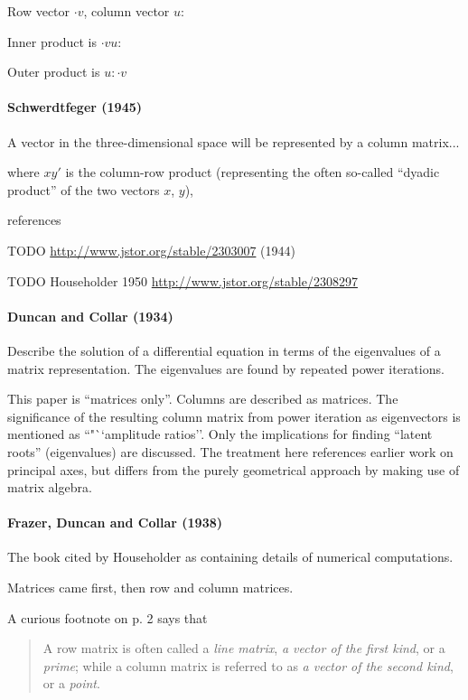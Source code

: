 Row vector $\cdot v$, column vector $u:$

Inner product is $\cdot v u:$

Outer product is $u:\cdot v$



\paragraph{Schwerdtfeger (1945)~\cite{Schwerdtfeger1945}}

A vector in the three-dimensional space will
be represented by a column matrix...

where $xy'$ is the column-row product (representing
the often so-called ``dyadic product'' of the
two vectors $x$, $y$),

references \cite{Schwerdtfeger1938,Murnaghan1938,Pipes1937}

TODO \url{http://www.jstor.org/stable/2303007} (1944)

TODO Householder 1950 \url{http://www.jstor.org/stable/2308297}

\paragraph{Duncan and Collar (1934)\cite{Duncan1934}}

Describe the solution of a differential equation in terms of the eigenvalues of
a matrix representation. The eigenvalues are found by repeated power iterations.

This paper is ``matrices only''. Columns are described as matrices.
The significance of the resulting column matrix from power iteration as
eigenvectors is mentioned as ``"``amplitude ratios''.
Only the implications for finding ``latent roots'' (eigenvalues) are discussed.
The treatment here references earlier work on principal axes, but differs from
the purely geometrical approach by making use of matrix algebra.

\paragraph{Frazer, Duncan and Collar (1938)~\cite{Frazer1938}}

The book cited by Householder as containing details of numerical computations.

Matrices came first, then row and column matrices.

A curious footnote on p. 2 says that
\begin{quote}
    A row matrix is often called a \textit{line matrix}, \textit{a vector of the first kind},
    or a \textit{prime}; while a column matrix is referred to as \textit{a vector of the second kind}, or a \textit{point}.
\end{quote}

